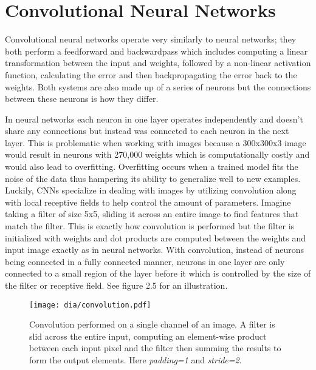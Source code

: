 \documentclass[12pt]{report}
\begin{document}
\section{Convolutional Neural Networks}
Convolutional neural networks operate very similarly to neural networks; they both perform a feedforward and backwardpass which includes computing a linear transformation between the input and weights, followed by a non-linear activation function, calculating the error and then backpropagating the error back to the weights. Both systems are also made up of a series of neurons but the connections between these neurons is how they differ. 

In neural networks each neuron in one layer operates independently and doesn't share any connections but instead was connected to each neuron in the next layer. This is problematic when working with images because a 300x300x3 image would result in neurons with 270,000 weights which is computationally costly and would also lead to overfitting. Overfitting occurs when a trained model fits the noise of the data thus hampering its ability to generalize well to new examples. Luckily, CNNs specialize in dealing with images by utilizing convolution along with local receptive fields to help control the amount of parameters. Imagine taking a filter of size 5x5, sliding it across an entire image to find features that match the filter.  This is exactly how convolution is performed but the filter is initialized with weights and dot products are computed between the weights and input image exactly as in neural networks. With convolution, instead of neurons being connected in a fully connected manner, neurons in one layer are only connected to a small region of the layer before it which is controlled by the size of the filter or receptive field. See figure 2.5 for an illustration.

\begin{figure}[H]
\centering
\texttt{[image: dia/convolution.pdf]}
\caption[Convolution performed on a single channel] {Convolution performed on a single channel of an image. A filter is slid across the entire input, computing an element-wise product between each input pixel and the filter then summing the results to form the output elements. Here \textit{padding=1} and \textit{stride=2}.  }
\end{figure}
\end{document}
